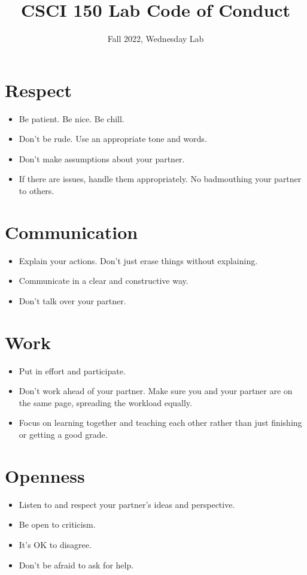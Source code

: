 \documentclass{tufte-handout}
\title{CSCI 150 Lab Code of Conduct}
\date{Fall 2022, Wednesday Lab}
\begin{document}
\maketitle

\section{Respect}

\begin{itemize}
  \item Be patient. Be nice. Be chill.
  \item Don't be rude.  Use an appropriate tone and words.
  \item Don't make assumptions about your partner.
  \item If there are issues, handle them appropriately.  No
    badmouthing your partner to others.
\end{itemize}

\section{Communication}

\begin{itemize}
  \item Explain your actions.  Don't just erase things without
    explaining.
  \item Communicate in a clear and constructive way.
  \item Don't talk over your partner.
\end{itemize}

\section{Work}

\begin{itemize}
  \item Put in effort and participate.
  \item Don't work ahead of your partner.  Make sure you and your
    partner are on the same page, spreading the workload equally.
  \item Focus on learning together and teaching each other rather than
    just finishing or getting a good grade.
\end{itemize}

\section{Openness}

\begin{itemize}
\item Listen to and respect your partner's ideas and perspective.
\item Be open to criticism.
\item It's OK to disagree.
\item Don't be afraid to ask for help.
\end{itemize}
\end{document}
